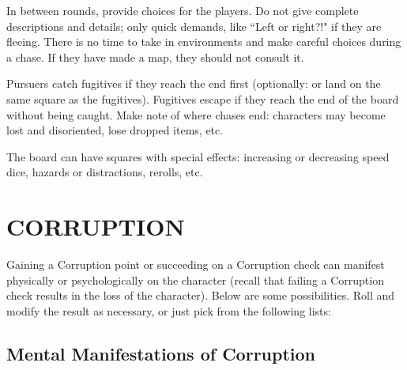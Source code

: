 \documentclass[twoside]{article}
\begin{document}
\bigbreak

In between rounds, provide choices for the players. Do not give complete descriptions and details; only quick demands, like ``Left or right?!" if they are fleeing. There is no time to take in environments and make careful choices during a chase. If they have made a map, they should not consult it.

\bigbreak

Pursuers catch fugitives if they reach the end first (optionally: or land on the same square as the fugitives). Fugitives escape if they reach the end of the board without being caught. Make note of where chases end: characters may become lost and disoriented, lose dropped items, etc. 

\bigbreak

The board can have squares with special effects: increasing or decreasing speed dice, hazards or distractions, rerolls, etc.

\section*{CORRUPTION}

Gaining a Corruption point or succeeding on a Corruption check can manifest physically or psychologically on the character (recall that failing a Corruption check results in the loss of the character). Below are some possibilities. Roll and modify the result as necessary, or just pick from the following lists:

\subsection*{Mental Manifestations of Corruption}
\end{document}
